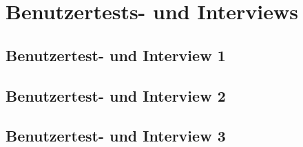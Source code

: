 \chapter{Benutzertests- und Interviews}
\label{chap:flinterviews}

	\section{Benutzertest- und Interview 1}
	\label{sec:flinterview1}
	
	\section{Benutzertest- und Interview 2}
	\label{sec:flinterview2}
	
	\section{Benutzertest- und Interview 3}
	\label{sec:flinterview3}